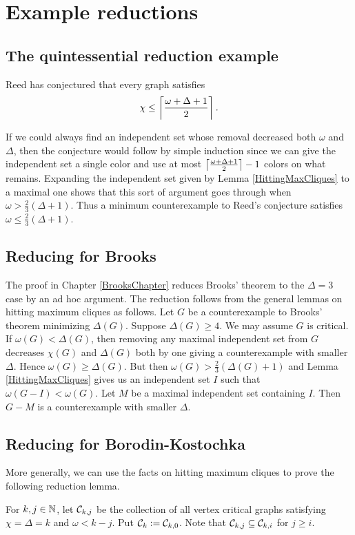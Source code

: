 \section{Example reductions}
\subsection{The quintessential reduction example}
Reed \cite{reed1998omega} has conjectured that every graph satisfies
\[\chi \leq \left\lceil\frac{\omega + \Delta + 1}{2}\right\rceil.\]

If we could always find an independent set whose removal decreased both $\omega$ and $\Delta$, then the conjecture would follow by simple induction since we can give the independent set a single color and use at most $\left\lceil\frac{\omega + \Delta + 1}{2}\right\rceil - 1$ colors on what remains.  Expanding the independent set given by Lemma \ref{HittingMaxCliques} to a maximal one shows that this sort of argument goes through when $\omega > \frac{2}{3}(\Delta + 1)$. Thus a minimum counterexample to Reed's conjecture satisfies $\omega \leq \frac{2}{3}(\Delta + 1)$.

\subsection{Reducing for Brooks}
The proof in Chapter \ref{BrooksChapter} reduces Brooks'
theorem to the $\Delta=3$ case by an ad hoc argument. The reduction follows
from the general lemmas on hitting maximum cliques as follows. Let $G$ be a
counterexample to Brooks' theorem minimizing $\Delta(G)$. Suppose $\Delta(G) \geq 4$. We may assume $G$ is critical. If $\omega(G) < \Delta(G)$, then removing any maximal independent set from $G$ decreases $\chi(G)$ and $\Delta(G)$ both by one giving a counterexample 
with smaller $\Delta$.  Hence $\omega(G) \geq \Delta(G)$.  
But then $\omega(G) > \frac{2}{3}(\Delta(G) + 1)$ and Lemma \ref{HittingMaxCliques} gives us an independent 
set $I$ such that $\omega(G-I) < \omega(G)$.  Let $M$ be a maximal independent set containing $I$.  
Then $G-M$ is a counterexample with smaller $\Delta$.

\subsection{Reducing for Borodin-Kostochka}
More generally, we can use the facts on hitting maximum cliques to prove the following reduction lemma.

\begin{defn}
For $k, j \in \mathbb{N}$, let $\mathcal{C}_{k, j}$ be the collection of all vertex critical graphs satisfying $\chi = \Delta = k$ and $\omega < k - j$.  Put $\mathcal{C}_{k} \mathrel{\mathop:}= \mathcal{C}_{k, 0}$. Note that $\mathcal{C}_{k, j} \subseteq \mathcal{C}_{k, i}$ for $j \geq i$.
\end{defn}

